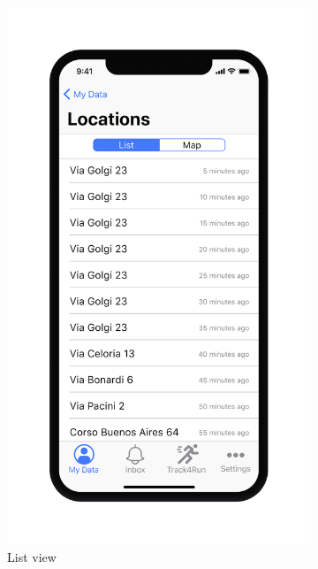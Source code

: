 \begin{figure}[H]
\centering
\begin{subfigure}{.5\textwidth}
  \centering
  \includegraphics[width=.8\textwidth]{./Pictures/Mockup/mobile/location1.png}
  \captionsetup{skip=0pt}
  \caption{List view}
  \label{ffig:mobile-location1}
\end{subfigure}%
\begin{subfigure}{.5\textwidth}
  \centering

\end{subfigure}
\end{figure}
